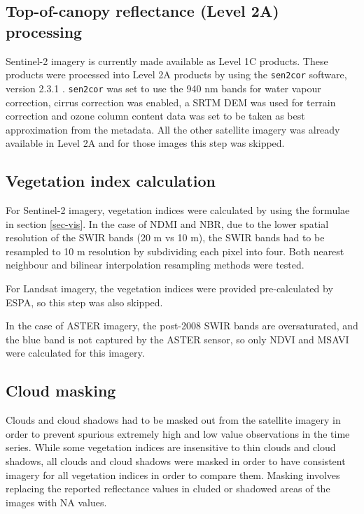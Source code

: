 \documentclass[a4paper,12pt]{scrbook}
\begin{document}
\subsection{Top-of-canopy reflectance (Level 2A) processing}

Sentinel-2 imagery is currently made available as Level 1C products. These products were processed into Level 2A products by using the \texttt{sen2cor} software, version 2.3.1 \citep{mueller-wilm_sen2cor_2016}. \texttt{sen2cor} was set to use the 940 nm bands for water vapour correction, cirrus correction was enabled, a \ac{SRTM} \ac{DEM} was used for terrain correction and ozone column content data was set to be taken as best approximation from the metadata. All the other satellite imagery was already available in Level 2A and for those images this step was skipped.

\subsection{Vegetation index calculation}

For Sentinel-2 imagery, vegetation indices were calculated by using the formulae in section \ref{sec-vis}. In the case of \ac{NDMI} and \ac{NBR}, due to the lower spatial resolution of the \ac{SWIR} bands (20 m vs 10 m), the \ac{SWIR} bands had to be resampled to 10 m resolution by subdividing each pixel into four. Both nearest neighbour and bilinear interpolation resampling methods were tested.

For Landsat imagery, the vegetation indices were provided pre-calculated by \ac{ESPA}, so this step was also skipped.

In the case of \ac{ASTER} imagery, the post-2008 \ac{SWIR} bands are oversaturated, and the blue band is not captured by the \ac{ASTER} sensor, so only \ac{NDVI} and \ac{MSAVI} were calculated for this imagery.

\subsection{Cloud masking}

Clouds and cloud shadows had to be masked out from the satellite imagery in order to prevent spurious extremely high and low value observations in the time series. While some vegetation indices are insensitive to thin clouds and cloud shadows, all clouds and cloud shadows were masked in order to have consistent imagery for all vegetation indices in order to compare them. Masking involves replacing the reported reflectance values in cluded or shadowed areas of the images with \ac{NA} values.
\end{document}
